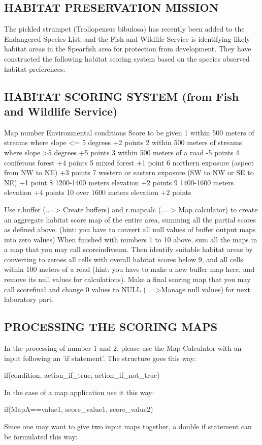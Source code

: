 \subsection{HABITAT PRESERVATION MISSION}
The pickled strumpet (Trollopensus bibulosa) has recently been added to the Endangered Species List, and the Fish and Wildlife Service is identifying likely habitat areas in the Spearfish area for protection from development. They have constructed the following habitat scoring system based on the species observed habitat preferences:

\subsection{HABITAT SCORING SYSTEM (from Fish and Wildlife Service) }

Map number Environmental conditions Score to be given
1 within 500 meters of streams where slope <= 5 degrees +2 points
2 within 500 meters of streams where slope >5 degrees +5 points
3 within 500 meters of a road -5 points
4 coniferous forest +4 points
5 mixed forest +1 point
6 northern exposure (aspect from NW to NE) +3 points
7 western or eastern exposure (SW to NW or SE to NE) +1 point
8 1200-1400 meters elevation +2 points
9 1400-1600 meters elevation +4 points
10 over 1600 meters elevation +2 points

Use r.buffer (..=> Create buffers) and r.mapcalc (..=> Map calculator) to create an aggregate habitat score map of the entire area, summing all the partial scores as defined above. (hint: you have to convert all null values of buffer output maps into zero values)
When finished with numbers 1 to 10 above, sum all the maps in a map that you may call scoreindivsum. Then identify suitable habitat areas by converting to zeroes all cells with overall habitat scores below 9, and all cells within 100 meters of a road (hint: you have to make a new buffer map here, and remove its null values for calculations). Make a final scoring map that you may call scorefinal and change 0 values to NULL (..=>Manage null values) for next laboratory part.

\subsection{PROCESSING THE SCORING MAPS}

In the processing of number 1 and 2, please use the Map Calculator with an input following an 'if statement'. The structure goes this
way:
\begin{smallverbatim}
if(condition, action_if_true, action_if_not_true)
\end{smallverbatim}
In the case of a map application use it this way:
\begin{smallverbatim}
if(MapA==value1, score_value1, score_value2)
\end{smallverbatim}
Since one may want to give two input maps together, a double if statement can be formulated this way:

